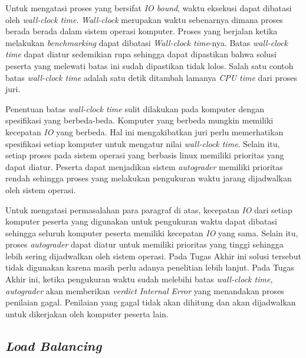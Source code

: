 \par Untuk mengatasi proses yang bersifat \textit{IO bound}, waktu eksekusi dapat dibatasi oleh \textit{wall-clock time}. \textit{Wall-clock} merupakan waktu sebenarnya dimana proses berada berada dalam sistem operasi komputer. Proses yang berjalan ketika melakukan \textit{benchmarking} dapat dibatasi \textit{Wall-clock time}-nya. Batas \textit{wall-clock time} dapat diatur sedemikian rupa sehingga dapat dipastikan bahwa solusi peserta yang melewati batas ini sudah dipastikan tidak lolos. Salah satu contoh batas \textit{wall-clock time} adalah satu detik ditambah lamanya \textit{CPU time} dari proses juri.

\par Penentuan batas \textit{wall-clock time} sulit dilakukan pada komputer dengan spesifikasi yang berbeda-beda. Komputer yang berbeda mungkin memiliki kecepatan \textit{IO} yang berbeda. Hal ini mengakibatkan juri perlu memerhatikan spesifikasi setiap komputer untuk mengatur nilai \textit{wall-clock time}. Selain itu, setiap proses pada sistem operasi yang berbasis linux memiliki prioritas yang dapat diatur. Peserta dapat menjadikan sistem \textit{autograder} memiliki prioritas rendah sehingga proses yang melakukan pengukuran waktu jarang dijadwalkan oleh sistem operasi.

\par Untuk mengatasi permasalahan para paragraf di atas, kecepatan \textit{IO} dari setiap komputer peserta yang digunakan untuk pengukuran waktu dapat dibatasi sehingga seluruh komputer peserta memiliki kecepatan \textit{IO} yang sama. Selain itu, proses \textit{autograder} dapat diatur untuk memiliki prioritas yang tinggi sehingga lebih sering dijadwalkan oleh sistem operasi. Pada Tugas Akhir ini solusi tersebut tidak digunakan karena masih perlu adanya penelitian lebih lanjut. Pada Tugas Akhir ini, ketika pengukuran waktu sudah melebihi batas \textit{wall-clock time}, \textit{autograder} akan memberikan \textit{verdict} \textit{Internal Error} yang menandakan proses penilaian gagal. Penilaian yang gagal tidak akan dihitung dan akan dijadwalkan untuk dikerjakan oleh komputer peserta lain. 

\subsection{\textit{Load Balancing}}

